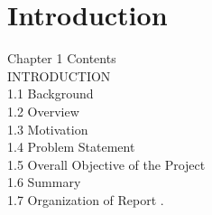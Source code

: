 \chapter{Introduction}\thispagestyle{thesisstyle} %

\graphicspath{{Chapter1/figures/}}
{}
Chapter 1 Contents\\

INTRODUCTION \\
1.1 Background \\
1.2 Overview \\
1.3 Motivation \\
1.4 Problem Statement \\
1.5 Overall Objective of the Project \\
1.6 Summary \\
1.7 Organization of Report .\\












